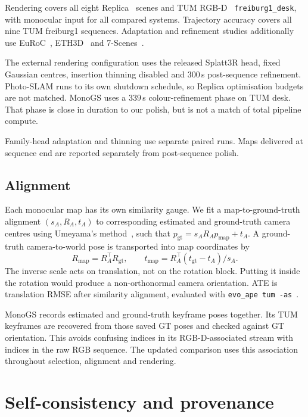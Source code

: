 Rendering covers all eight Replica~\cite{straub2019replica} scenes and TUM
RGB-D~\cite{sturm2012tum} \texttt{freiburg1\_desk}, with monocular input for
all compared systems. Trajectory accuracy covers all nine TUM freiburg1
sequences. Adaptation and refinement studies additionally use
EuRoC~\cite{burri2016euroc}, ETH3D~\cite{schops2017eth3d} and
7-Scenes~\cite{shotton2013scenecoord}.

The external rendering configuration uses the released Splatt3R head,
fixed Gaussian centres, insertion thinning disabled and $300$\,s
post-sequence refinement. Photo-SLAM runs to its own shutdown schedule, so
Replica optimisation budgets are not matched. MonoGS uses a $339$\,s
colour-refinement phase on TUM desk. That phase is close in duration to our
polish, but is not a match of total pipeline compute.

Family-head adaptation and thinning use separate paired runs. Maps delivered
at sequence end are reported separately from post-sequence polish.

\subsection{Alignment}

Each monocular map has its own similarity gauge. We fit a map-to-ground-truth
alignment $(s_A,R_A,t_A)$ to corresponding estimated and ground-truth camera
centres using Umeyama's method~\cite{umeyama1991}, such that
$p_{\mathrm{gt}}=s_AR_Ap_{\mathrm{map}}+t_A$. A ground-truth
camera-to-world pose is transported into map coordinates by
\begin{equation}
R_{\text{map}}=R_A^\top R_{\text{gt}},\qquad
t_{\text{map}}=R_A^\top(t_{\text{gt}}-t_A)/s_A.
\label{eq:align}
\end{equation}
The inverse scale acts on translation, not on the rotation block. Putting it
inside the rotation would produce a non-orthonormal camera orientation.
ATE is translation RMSE after similarity alignment, evaluated with
\texttt{evo\_ape tum -as}~\cite{grupp2017evo}.

MonoGS records estimated and ground-truth keyframe poses together. Its TUM
keyframes are recovered from those saved GT poses and checked against GT
orientation. This avoids confusing indices in its RGB-D-associated stream
with indices in the raw RGB sequence. The updated comparison uses this
association throughout selection, alignment and rendering.

\section{Self-consistency and provenance}
\label{sec:protocol:selfcheck}

